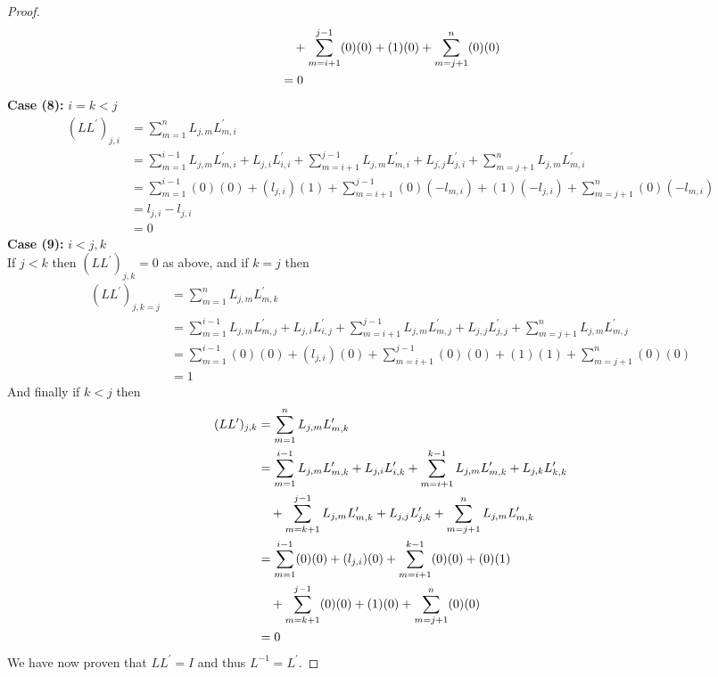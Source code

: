 \documentclass[12pt]{article}
\begin{document}
\begin{proof}
\begin{align*}
				&\text{\space \space \space} + \sum\limits_{m=i+1}^{j-1} (0)(0) + (1)(0) + \sum\limits_{m=j+1}^{n} (0)(0) \\
			& = 0
		\end{align*}
		\textbf{Case (8):} $i=k<j$
		\begin{align*}
			(LL^\prime)_{j,i} & = \sum\limits_{m=1}^n L_{j,m}L^\prime_{m,i} \\
			& = \sum\limits_{m=1}^{i-1} L_{j,m}L^\prime_{m,i} + L_{j,i}L^\prime_{i,i} + \sum\limits_{m=i+1}^{j-1} L_{j,m}L^\prime_{m,i} + L_{j,j}L^\prime_{j,i} + \sum\limits_{m=j+1}^{n} L_{j,m}L^\prime_{m,i} \\
			& = \sum\limits_{m=1}^{i-1} (0)(0) + (l_{j,i})(1) + \sum\limits_{m=i+1}^{j-1} (0)(-l_{m,i}) + (1)(-l_{j,i}) + \sum\limits_{m=j+1}^{n} (0)(-l_{m,i}) \\
			& = l_{j,i} - l_{j,i} \\
			& = 0
		\end{align*}
		\textbf{Case (9):} $i< j,k$ \\
		If $j<k$ then $(LL^\prime)_{j,k} = 0$ as above, and if $k=j$ then
		\begin{align*}
			(LL^\prime)_{j,k=j} & = \sum\limits_{m=1}^n L_{j,m}L^\prime_{m,k} \\
			& = \sum\limits_{m=1}^{i-1} L_{j,m}L^\prime_{m,j} + L_{j,i}L^\prime_{i,j} + \sum\limits_{m=i+1}^{j-1} L_{j,m}L^\prime_{m,j} + L_{j,j}L^\prime_{j,j} + \sum\limits_{m=j+1}^{n} L_{j,m}L^\prime_{m,j} \\
			& = \sum\limits_{m=1}^{i-1} (0)(0) + (l_{j,i})(0) + \sum\limits_{m=i+1}^{j-1} (0)(0) + (1)(1) + \sum\limits_{m=j+1}^{n} (0)(0)\\
			& = 1
		\end{align*}
		And finally if $k < j$ then
		\begin{align*}
			(LL^\prime)_{j,k} & = \sum\limits_{m=1}^n L_{j,m}L^\prime_{m,k} \\
			& = \sum\limits_{m=1}^{i-1} L_{j,m}L^\prime_{m,k} + L_{j,i}L^\prime_{i,k} + \sum\limits_{m=i+1}^{k-1} L_{j,m}L^\prime_{m,k} + L_{j,k}L^\prime_{k,k} \\
				&\text{\space \space \space} + \sum\limits_{m=k+1}^{j-1} L_{j,m}L^\prime_{m,k} + L_{j,j}L^\prime_{j,k} + \sum\limits_{m=j+1}^{n} L_{j,m}L^\prime_{m,k} \\
			& = \sum\limits_{m=1}^{i-1} (0)(0) + (l_{j,i})(0) + \sum\limits_{m=i+1}^{k-1} (0)(0) + (0)(1) \\
				&\text{\space \space \space} + \sum\limits_{m=k+1}^{j-1} (0)(0) + (1)(0) + \sum\limits_{m=j+1}^{n} (0)(0) \\
			& = 0
		\end{align*}
		We have now proven that $LL^\prime = I$ and thus $L^{-1}=L^\prime$.		
	\end{proof}
	
\end{document}

